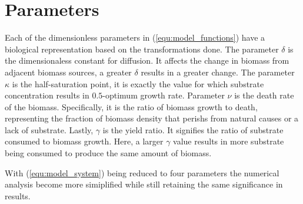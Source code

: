 \section{Parameters}

Each of the dimensionless parameters in (\ref{equ:model_functions}) have a biological representation based on the transformations done.
The parameter $\delta$ is the dimensionaless constant for diffusion.
It affects the change in biomass from adjacent biomass sources, a greater $\delta$ results in a greater change.
The parameter $\kappa$ is the half-saturation point, it is exactly the value for which substrate concentration results in $0.5$-optimum growth rate.
Parameter $\nu$ is the death rate of the biomass.
Specifically, it is the ratio of biomass growth to death, representing the fraction of biomass density that perishs from natural causes or a lack of substrate.
Lastly, $\gamma$ is the yield ratio.
It signifies the ratio of substrate consumed to biomass growth.
Here, a larger $\gamma$ value results in more substrate being consumed to  produce the same amount of biomass. 

With (\ref{equ:model_system}) being reduced to four parameters the numerical analysis become more simiplified while still retaining the same significance in results.
